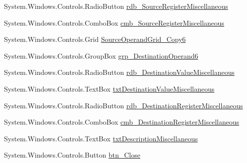 \begin{DoxyCompactItemize}
\item 
System.\+Windows.\+Controls.\+Radio\+Button \hyperlink{class_c_p_u___o_s___simulator_1_1_instructions_window_ad2b0098ef721214b53b9e3241e611a84}{rdb\+\_\+\+Source\+Register\+Miscellaneous}
\item 
System.\+Windows.\+Controls.\+Combo\+Box \hyperlink{class_c_p_u___o_s___simulator_1_1_instructions_window_a98245ef6ca4796b7f59fe4b9937a388e}{cmb\+\_\+\+Source\+Register\+Miscellaneous}
\item 
System.\+Windows.\+Controls.\+Grid \hyperlink{class_c_p_u___o_s___simulator_1_1_instructions_window_a3dfdd68ad6b08fb1612fd43a420e5193}{Source\+Operand\+Grid\+\_\+\+Copy6}
\item 
System.\+Windows.\+Controls.\+Group\+Box \hyperlink{class_c_p_u___o_s___simulator_1_1_instructions_window_a8e457b3503625b5e837320ad9eb439c6}{grp\+\_\+\+Destination\+Operand6}
\item 
System.\+Windows.\+Controls.\+Radio\+Button \hyperlink{class_c_p_u___o_s___simulator_1_1_instructions_window_a567c8bba810d30e3c382e527e132a230}{rdb\+\_\+\+Destination\+Value\+Miscellaneous}
\item 
System.\+Windows.\+Controls.\+Text\+Box \hyperlink{class_c_p_u___o_s___simulator_1_1_instructions_window_a7fa1615bacb3264ac8ce61787a28d477}{txt\+Destination\+Value\+Miscellaneous}
\item 
System.\+Windows.\+Controls.\+Radio\+Button \hyperlink{class_c_p_u___o_s___simulator_1_1_instructions_window_adc4aa664244631ae1240a81d5c3b8ab5}{rdb\+\_\+\+Destination\+Register\+Miscellaneous}
\item 
System.\+Windows.\+Controls.\+Combo\+Box \hyperlink{class_c_p_u___o_s___simulator_1_1_instructions_window_ac4dab6ef32a46a295d6937b6bbda7813}{cmb\+\_\+\+Destination\+Register\+Miscellaneous}
\item 
System.\+Windows.\+Controls.\+Text\+Box \hyperlink{class_c_p_u___o_s___simulator_1_1_instructions_window_aaf938911ac6e23d7d637245cf40e6cbe}{txt\+Description\+Miscellaneous}
\item 
System.\+Windows.\+Controls.\+Button \hyperlink{class_c_p_u___o_s___simulator_1_1_instructions_window_a06305ca0735ae2d93a331fb33d2fe88f}{btn\+\_\+\+Close}
\end{DoxyCompactItemize}
